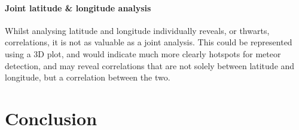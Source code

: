 \paragraph{Joint latitude \& longitude analysis\\}
Whilst analysing latitude and longitude individually reveals, or thwarts, correlations, it is not as valuable as a joint analysis. This could be represented using a 3D plot, and would indicate much more clearly hotspots for meteor detection, and may reveal correlations that are not solely between latitude and longitude, but a correlation between the two.

\section{Conclusion}